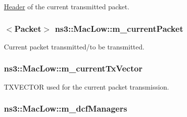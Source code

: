\hyperlink{classns3_1_1Header}{Header} of the current transmitted packet. 

\subsubsection[{\texorpdfstring{m\+\_\+current\+Packet}{m_currentPacket}}]{$<${\bf Packet}$>$ ns3\+::\+Mac\+Low\+::m\+\_\+current\+Packet\hspace{0.3cm}{\ttfamily [private]}}\hypertarget{classns3_1_1MacLow_aa4f81bb523ceed1bbf5a84851b25e29c}{}\label{classns3_1_1MacLow_aa4f81bb523ceed1bbf5a84851b25e29c}


Current packet transmitted/to be transmitted. 

\subsubsection[{\texorpdfstring{m\+\_\+current\+Tx\+Vector}{m_currentTxVector}}]{ ns3\+::\+Mac\+Low\+::m\+\_\+current\+Tx\+Vector\hspace{0.3cm}{\ttfamily [private]}}\hypertarget{classns3_1_1MacLow_af87bd81ded4d362f9f1dc89dbbee65a3}{}\label{classns3_1_1MacLow_af87bd81ded4d362f9f1dc89dbbee65a3}


T\+X\+V\+E\+C\+T\+OR used for the current packet transmission. 

\subsubsection[{\texorpdfstring{m\+\_\+dcf\+Managers}{m_dcfManagers}}]{ ns3\+::\+Mac\+Low\+::m\+\_\+dcf\+Managers\hspace{0.3cm}{\ttfamily [private]}}\hypertarget{classns3_1_1MacLow_adf307ef209557c58594aeaa3679187bc}{}\label{classns3_1_1MacLow_adf307ef209557c58594aeaa3679187bc}



